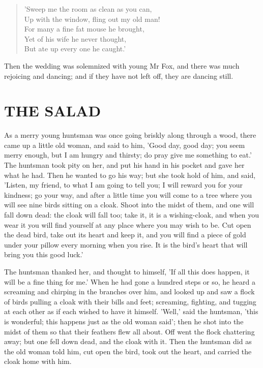 \documentclass[12pt]{book}
\begin{document}
\begin{verse}
 'Sweep me the room as clean as you can,\\
  Up with the window, fling out my old man!\\
  For many a fine fat mouse he brought,\\
  Yet of his wife he never thought,\\
  But ate up every one he caught.'
\end{verse}

Then the wedding was solemnized with young Mr Fox, and there was much
rejoicing and dancing; and if they have not left off, they are dancing
still.



\chapter{THE SALAD}

As a merry young huntsman was once going briskly along through a wood,
there came up a little old woman, and said to him, 'Good day, good
day; you seem merry enough, but I am hungry and thirsty; do pray give
me something to eat.' The huntsman took pity on her, and put his hand
in his pocket and gave her what he had. Then he wanted to go his way;
but she took hold of him, and said, 'Listen, my friend, to what I am
going to tell you; I will reward you for your kindness; go your way,
and after a little time you will come to a tree where you will see
nine birds sitting on a cloak. Shoot into the midst of them, and one
will fall down dead: the cloak will fall too; take it, it is a
wishing-cloak, and when you wear it you will find yourself at any
place where you may wish to be. Cut open the dead bird, take out its
heart and keep it, and you will find a piece of gold under your pillow
every morning when you rise. It is the bird's heart that will bring
you this good luck.'

The huntsman thanked her, and thought to himself, 'If all this does
happen, it will be a fine thing for me.' When he had gone a hundred
steps or so, he heard a screaming and chirping in the branches over
him, and looked up and saw a flock of birds pulling a cloak with their
bills and feet; screaming, fighting, and tugging at each other as if
each wished to have it himself. 'Well,' said the huntsman, 'this is
wonderful; this happens just as the old woman said'; then he shot into
the midst of them so that their feathers flew all about. Off went the
flock chattering away; but one fell down dead, and the cloak with it.
Then the huntsman did as the old woman told him, cut open the bird,
took out the heart, and carried the cloak home with him.
\end{document}
